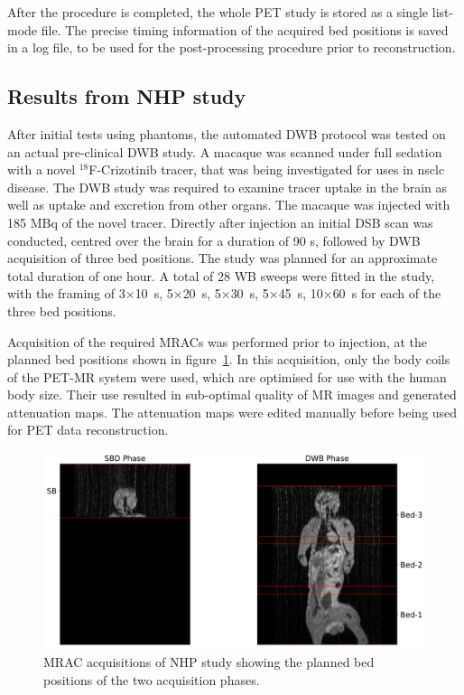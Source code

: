 After the procedure is completed, the whole PET study is stored as a single list-mode file. The precise timing information of the acquired bed positions is saved in a log file, to be used for the post-processing procedure prior to reconstruction.  

\subsection{Results from NHP study}
After initial tests using phantoms, the automated DWB protocol was tested on an actual pre-clinical DWB study. A macaque was scanned under full sedation with a novel $^{18}$F-Crizotinib tracer, that was being investigated for uses in \gls{nsclc} disease. The DWB study was required to examine tracer uptake in the brain as well as uptake and excretion from other organs. The macaque was injected with 185 \si{\mega \becquerel} of the novel tracer. Directly after injection an initial DSB scan was conducted, centred over the brain for a duration of 90 s, followed by DWB acquisition of three bed positions. The study was planned for an approximate total duration of one hour. A total of 28 WB sweeps were fitted in the study, with the framing of 3$\times$10~{s}, 5$\times$20~{s}, 5$\times$30~{s}, 5$\times$45~{s}, 10$\times$60~{s} for each of the three bed positions.

Acquisition of the required MRACs was performed prior to injection, at the planned bed positions shown in figure~\ref{fig3_1:Macaque_MRI}. In this acquisition, only the body coils of the PET-MR system were used, which are optimised for use with the human body size. Their use resulted in sub-optimal quality of MR images and generated attenuation maps. The attenuation maps were edited manually before being used for PET data reconstruction.

\begin{figure} [ht!]
\centering
\includegraphics[scale=0.5,angle=0]{3_Results/3_1_DWB_Optimization/figures/3_1_Macaque_MRI.pdf}
\caption{MRAC acquisitions of NHP study showing the planned bed positions of the two acquisition phases.}
\label{fig3_1:Macaque_MRI}
\end{figure}

